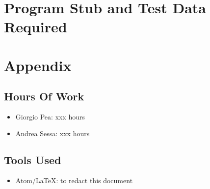 \documentclass[11pt,titlepage]{article} %
\begin{document}
\section{Program Stub and Test Data Required}

\section{Appendix}
  \subsection{Hours Of Work}
    \begin{itemize}
     \item Giorgio Pea: xxx hours
     \item Andrea Sessa: xxx hours
    \end{itemize}

  \subsection{Tools Used}
    \begin{itemize}
     \item  Atom/\LaTeX: to redact this document
    \end{itemize}
\end{document}

